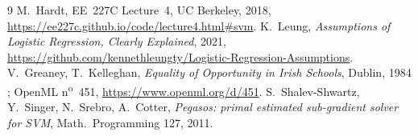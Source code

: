 \documentclass[a4paper,11pt]{article}
\begin{document}
\begin{thebibliography}{9}
 M.~Hardt, EE~227C Lecture~4, UC Berkeley, 2018, \url{https://ee227c.github.io/code/lecture4.html\#svm}.
 K.~Leung, \emph{Assumptions of Logistic Regression, Clearly Explained}, 2021,
  \url{https://github.com/kennethleungty/Logistic-Regression-Assumptions}.
 V.~Greaney, T.~Kelleghan, \emph{Equality of Opportunity in Irish Schools}, Dublin, 1984 ;
  OpenML n\textsuperscript{o}~451, \url{https://www.openml.org/d/451}.
 S.~Shalev-Shwartz, Y.~Singer, N.~Srebro, A.~Cotter, \emph{Pegasos: primal estimated
  sub-gradient solver for SVM}, Math.\ Programming 127, 2011.
\end{thebibliography}
\end{document}
